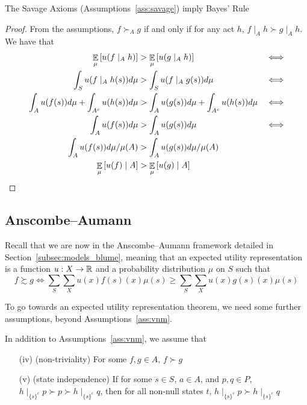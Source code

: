 \documentclass[12pt]{article}
\begin{document}
\begin{theorem}
	The Savage Axioms (Assumptions~\ref{ass:savage}) imply Bayes' Rule
\end{theorem}
\begin{proof}
	From the assumptions, $f \succ_A g$ if and only if for any act $h$, $f \mid_A h \succ g\mid_A h$. We have that
	\begin{align*}
		\mathop{\mathbb{E}}_\mu \left[ u(f\mid_A h)\right] &> \mathop{\mathbb{E}}_\mu\left[ u(g \mid_A h)\right] &&\Longleftrightarrow \\
		\int_S u(f \mid_A h(s)) d\mu &> \int_S u(f \mid_A g(s)) d\mu &&\Longleftrightarrow \\
		\int_A u(f(s))d\mu + \int_{A^c} u(h(s))d\mu &> \int_A u(g(s))d\mu + \int_{A^c} u(h(s))d\mu &&\Longleftrightarrow \\
		\int_A u(f(s))d\mu &> \int_A u(g(s))d\mu &&\Longleftrightarrow \\
		\int_A u(f(s))d\mu/\mu(A) &> \int_A u(g(s))d\mu/\mu(A) \\
		\mathop{\mathbb{E}}_\mu\left[ u(f) \mid A\right] &> \mathop{\mathbb{E}}_\mu\left[ u(g) \mid A\right]
	\end{align*}
\end{proof}

\subsection{Anscombe--Aumann}

\begin{remark}
	Recall that we are now in the Anscombe--Aumann framework detailed in Section~\ref{subsec:models_blume}, meaning that an expected utility representation is a function $u: X \to \mathbb{R}$ and a probability distribution $\mu$ on $S$ such that
	\[
	f \succsim g \Longleftrightarrow \sum_S \sum_X u(x) f(s)(x) \mu(s) \ge \sum_S \sum_X u(x) g(s)(x) \mu(s) 
	\]
\end{remark}

To go towards an expected utility representation theorem, we need some further assumptions, beyond Assumptions~\ref{ass:vnm}.

\begin{assumption}\label{ass:aa}
	In addition to Assumptions~\ref{ass:vnm}, we assume that
	
	\begin{itemize}
		\item[(iv)] (non-triviality) For some $f,g \in A$, $f \succ g$
		\item[(v)] (state independence) If for some $s \in S$, $a \in A$, and $p,q \in P$, $h\mid_{\{s\}^c}p \succ p \succ h\mid_{\{s\}^c}q$, then for all non-null states $t$, $h \mid_{\{s\}^c} p \succ h \mid_{\{s\}^c} q$
	\end{itemize}
\end{assumption}
\end{document}
